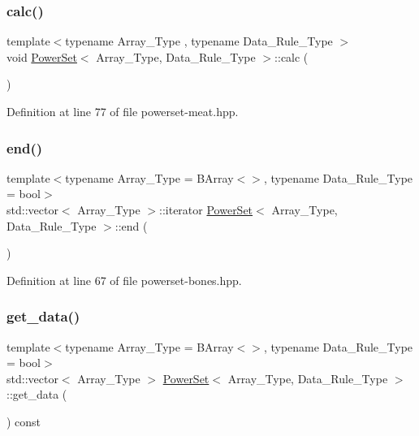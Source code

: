 \subsubsection{\texorpdfstring{calc()}{calc()}}
{\footnotesize\ttfamily template$<$typename Array\+\_\+\+Type , typename Data\+\_\+\+Rule\+\_\+\+Type $>$ \\
void \hyperlink{class_power_set}{Power\+Set}$<$ Array\+\_\+\+Type, Data\+\_\+\+Rule\+\_\+\+Type $>$\+::calc (\begin{DoxyParamCaption}{ }\end{DoxyParamCaption})\hspace{0.3cm}{\ttfamily [inline]}}



Definition at line 77 of file powerset-\/meat.\+hpp.

\mbox{\label{class_power_set_ac734ed684aa314b722a05d423c607a38}} 
\subsubsection{\texorpdfstring{end()}{end()}}
{\footnotesize\ttfamily template$<$typename Array\+\_\+\+Type  = B\+Array$<$$>$, typename Data\+\_\+\+Rule\+\_\+\+Type  = bool$>$ \\
std\+::vector$<$ Array\+\_\+\+Type $>$\+::iterator \hyperlink{class_power_set}{Power\+Set}$<$ Array\+\_\+\+Type, Data\+\_\+\+Rule\+\_\+\+Type $>$\+::end (\begin{DoxyParamCaption}{ }\end{DoxyParamCaption})\hspace{0.3cm}{\ttfamily [inline]}}



Definition at line 67 of file powerset-\/bones.\+hpp.

\mbox{\label{class_power_set_a4de44631d9a7967db4dd791d42166115}} 
\subsubsection{\texorpdfstring{get\+\_\+data()}{get\_data()}}
{\footnotesize\ttfamily template$<$typename Array\+\_\+\+Type  = B\+Array$<$$>$, typename Data\+\_\+\+Rule\+\_\+\+Type  = bool$>$ \\
std\+::vector$<$ Array\+\_\+\+Type $>$ \hyperlink{class_power_set}{Power\+Set}$<$ Array\+\_\+\+Type, Data\+\_\+\+Rule\+\_\+\+Type $>$\+::get\+\_\+data (\begin{DoxyParamCaption}{ }\end{DoxyParamCaption}) const\hspace{0.3cm}{\ttfamily [inline]}}



